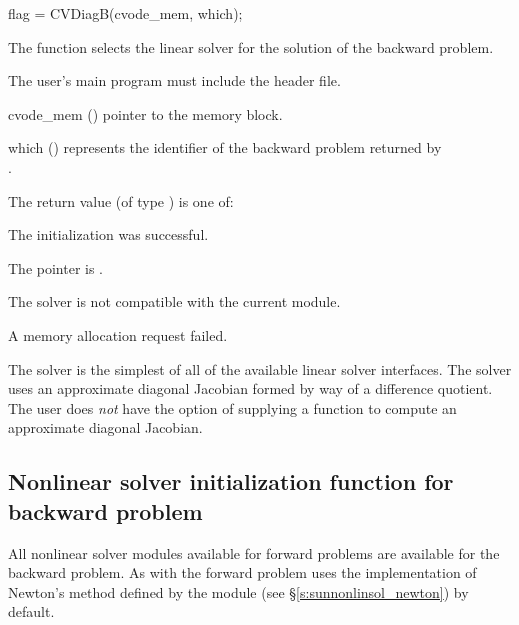 {
  flag = CVDiagB(cvode\_mem, which);
}
{
  The function  selects the {\cvdiag} linear solver for the solution
  of the backward problem.

  The user's main program must include the  header file.
}
{
  \begin{args}
  \item[cvode\_mem] ()
    pointer to the {\cvodes} memory block.
  \item[which] ()
    represents the identifier of the backward problem returned by \\ \noindent
    .
  \end{args}
}
{
  The return value  (of type ) is one of:
  \begin{args}
  \item[\Id{CVDIAG\_SUCCESS}]
    The {\cvdiag} initialization was successful.
  \item[\Id{CVDIAG\_MEM\_NULL}]
    The  pointer is .
  \item[\Id{CVDIAG\_ILL\_INPUT}]
    The {\cvdiag} solver is not compatible with the current {\nvector} module.
  \item[\Id{CVDIAG\_MEM\_FAIL}]
    A memory allocation request failed.
  \end{args}
}
{
  The {\cvdiag} solver is the simplest of all of the available {\cvodes}
  linear solver interfaces.  The {\cvdiag} solver uses an approximate
  diagonal Jacobian formed by way of a difference quotient. The user
  does {\em not} have the option of supplying a function to compute an
  approximate diagonal Jacobian.
}


\subsection{Nonlinear solver initialization function for backward problem}
\label{sss:nonlin_solv_init_b}

All {\cvodes} nonlinear solver modules available for forward problems
are available for the backward problem. As with the forward problem {\cvodes}
uses the {\sunnonlinsol} implementation of Newton's method defined by the
{\sunnonlinsolnewton} module (see \S\ref{s:sunnonlinsol_newton}) by default.

